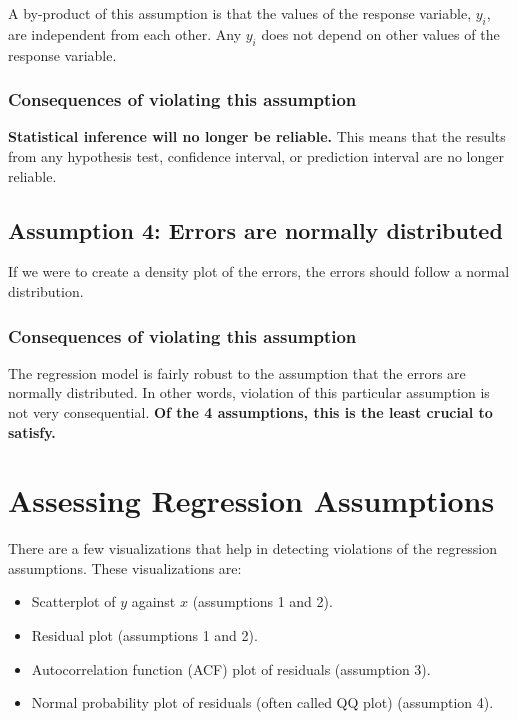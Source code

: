 \documentclass[
]{book}
\providecommand{\tightlist}{%
  \setlength{\itemsep}{0pt}\setlength{\parskip}{0pt}}
\begin{document}
A by-product of this assumption is that the values of the response variable, \(y_i\), are independent from each other. Any \(y_i\) does not depend on other values of the response variable.

\hypertarget{consequences-of-violating-this-assumption-2}{%
\subsubsection{Consequences of violating this assumption}\label{consequences-of-violating-this-assumption-2}}

\textbf{Statistical inference will no longer be reliable.} This means that the results from any hypothesis test, confidence interval, or prediction interval are no longer reliable.

\hypertarget{assumption-4-errors-are-normally-distributed}{%
\subsection{Assumption 4: Errors are normally distributed}\label{assumption-4-errors-are-normally-distributed}}

If we were to create a density plot of the errors, the errors should follow a normal distribution.

\hypertarget{consequences-of-violating-this-assumption-3}{%
\subsubsection{Consequences of violating this assumption}\label{consequences-of-violating-this-assumption-3}}

The regression model is fairly robust to the assumption that the errors are normally distributed. In other words, violation of this particular assumption is not very consequential. \textbf{Of the 4 assumptions, this is the least crucial to satisfy.}

\hypertarget{assessing-regression-assumptions}{%
\section{Assessing Regression Assumptions}\label{assessing-regression-assumptions}}

There are a few visualizations that help in detecting violations of the regression assumptions. These visualizations are:

\begin{itemize}
\tightlist
\item
  Scatterplot of \(y\) against \(x\) (assumptions 1 and 2).
\item
  Residual plot (assumptions 1 and 2).
\item
  Autocorrelation function (ACF) plot of residuals (assumption 3).
\item
  Normal probability plot of residuals (often called QQ plot) (assumption 4).
\end{itemize}
\end{document}
